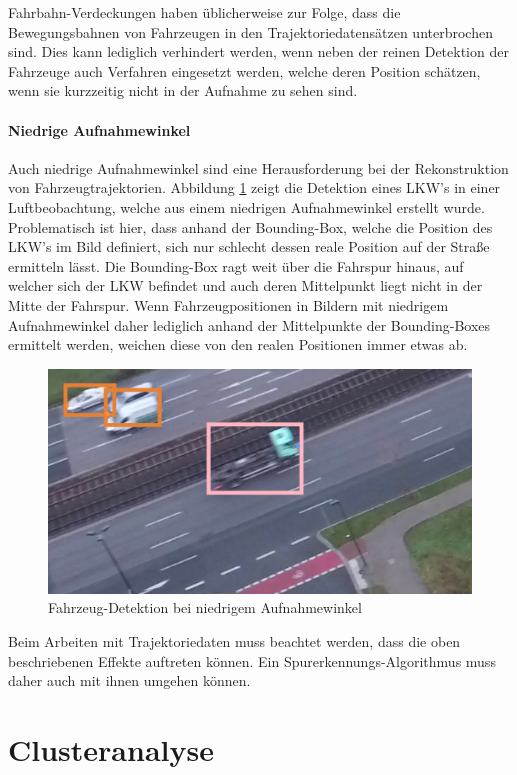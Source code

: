 Fahrbahn-Verdeckungen haben üblicherweise zur Folge, dass die Bewegungsbahnen von Fahrzeugen in den
Trajektoriedatensätzen unterbrochen sind. Dies kann lediglich verhindert werden, wenn neben der reinen
Detektion der Fahrzeuge auch Verfahren eingesetzt werden, welche deren Position schätzen, wenn sie kurzzeitig
nicht in der Aufnahme zu sehen sind.

\subsubsection*{Niedrige Aufnahmewinkel}

Auch niedrige Aufnahmewinkel sind eine Herausforderung bei der Rekonstruktion von Fahrzeugtrajektorien.
Abbildung \ref{fig:grund_low_angle_detection} zeigt die Detektion eines LKW's in einer Luftbeobachtung,
welche aus einem niedrigen Aufnahmewinkel erstellt wurde. Problematisch ist hier, dass anhand der Bounding-Box,
welche die Position des LKW's im Bild definiert, sich nur schlecht dessen reale Position auf der Straße ermitteln lässt.
Die Bounding-Box ragt weit über die Fahrspur hinaus, auf welcher sich der LKW befindet und auch deren Mittelpunkt
liegt nicht in der Mitte der Fahrspur. Wenn Fahrzeugpositionen in Bildern mit niedrigem Aufnahmewinkel daher lediglich
anhand der Mittelpunkte der Bounding-Boxes ermittelt werden, weichen diese von den realen Positionen immer etwas ab.

\begin{figure}[H]
    \centering
    \includegraphics[width=0.45\linewidth]{resources/img/grundlagen/TrajectoryReconstruction/challenges/low_angle}
    \caption{Fahrzeug-Detektion bei niedrigem Aufnahmewinkel}
    \label{fig:grund_low_angle_detection}
\end{figure}

Beim Arbeiten mit Trajektoriedaten muss beachtet werden, dass die oben beschriebenen Effekte auftreten
können. Ein Spurerkennungs-Algorithmus muss daher auch mit ihnen umgehen können.

\chapter{Clusteranalyse}
\label{sec:tra_clustering}

